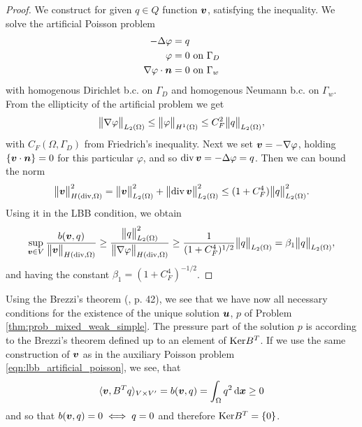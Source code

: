 \begin{proof}
We construct for given $q\in Q$ function $\mathbf{\boldsymbol{v}}$, satisfying the inequality.
We solve the artificial Poisson problem
\begin{equation} \label{eqn:lbb_artificial_poisson}
\begin{aligned}
    -\Delta\varphi &= q\\
    \varphi &= 0 \textrm{ on } \Gamma_D \\
    \nabla\varphi\cdot\mathbf{\boldsymbol{n}} &= 0 \textrm{ on } \Gamma_w
\end{aligned}
\end{equation}
with homogenous Dirichlet b.c. on $\Gamma_D$ and homogenous Neumann b.c. on $\Gamma_w$.
From the ellipticity of the artificial problem we get
\begin{equation}
    \bigl\Vert\nabla\varphi\bigr\Vert_{L_2(\Omega)} \leq \bigl\Vert\varphi\bigr\Vert_{H^1(\Omega)}
        \leq C_F^2 \bigl\Vert q\bigr\Vert_{L_2(\Omega)},
\end{equation}
with $C_F(\Omega,\Gamma_D)$ from Friedrich's inequality.
Next we set $\mathbf{\boldsymbol{v}} = -\nabla \varphi$, holding $\{\mathbf{\boldsymbol{v}}\cdot\mathbf{\boldsymbol{n}}\}=0$ for this particular $\varphi$,
and so ${\rm div}\,\mathbf{\boldsymbol{v}} = -\Delta\varphi=q$. Then we can bound the norm
\begin{equation}
    \bigl\Vert\mathbf{\boldsymbol{v}}\bigr\Vert^2_{H({\rm div},\Omega)} = \bigl\Vert\mathbf{\boldsymbol{v}}\bigr\Vert^2_{L_2(\Omega)} 
        + \bigl\Vert{\rm div}\,\mathbf{\boldsymbol{v}}\bigr\Vert^2_{L_2(\Omega)}
        \leq (1+C_F^4) \bigl\Vert q\bigr\Vert^2_{L_2(\Omega)}.
\end{equation}
Using it in the LBB condition, we obtain
\begin{equation} \label{eqn:form_b_lbb_proof}
    \sup_{\mathbf{\boldsymbol{v}}\in V} \frac{b(\mathbf{\boldsymbol{v}},q)}{\bigl\Vert\mathbf{\boldsymbol{v}}\bigr\Vert_{H({\rm div},\Omega)}} \geq
    \frac{\bigl\Vert q\bigr\Vert^2_{L_2(\Omega)}}{\bigl\Vert\nabla\varphi\bigr\Vert_{H({\rm div},\Omega)}}
    \geq \frac{1}{(1+C_F^4)^{1/2}} \bigl\Vert q\bigr\Vert_{L_2(\Omega)} = \beta_1 \bigl\Vert q\bigr\Vert_{L_2(\Omega)},
\end{equation}
and having the constant $\beta_1 = (1+C_F^4)^{-1/2}$.
\end{proof}

Using the Brezzi's theorem (\cite{brezzi_mixed_1991}, p. 42), we see that we have now
all necessary conditions for the existence of the unique solution $\mathbf{\boldsymbol{u}}$, $p$ of Problem \eqref{thm:prob_mixed_weak_simple}.
The pressure part of the solution $p$ is according to the Brezzi's theorem defined up to an element of $\textrm{Ker} B^T$.
If we use the same construction of $\mathbf{\boldsymbol{v}}$ as in the auxiliary Poisson problem \eqref{eqn:lbb_artificial_poisson},
we see, that
\[
    \langle \mathbf{\boldsymbol{v}}, B^T q \rangle_{V\times V'} = b(\mathbf{\boldsymbol{v}},q) = \int_\Omega q^2 \,{\rm d}\mathbf{\boldsymbol{x}} \geq 0
\]
and so that $b(\mathbf{\boldsymbol{v}},q) = 0 \iff q=0$ and therefore $\textrm{Ker} B^T=\{0\}$.

